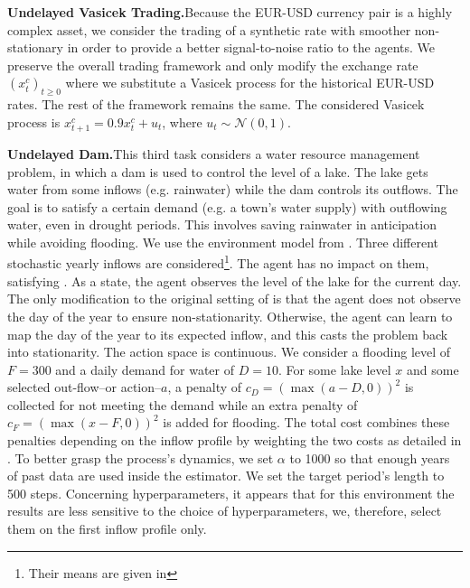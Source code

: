 \noindent\textbf{Undelayed Vasicek Trading.}\indent Because the EUR-USD currency pair is a highly complex asset, we consider the trading of a synthetic rate with smoother non-stationary in order to provide a better signal-to-noise ratio to the agents.
We preserve the overall trading framework and only modify the exchange rate $(x_{t}^{c})_{t\ge0}$ where we substitute a Vasicek process for the historical EUR-USD rates. 
The rest of the framework remains the same. 
The considered Vasicek process is $x_{t+1}^{c} = 0.9 x_{t}^{c} + u_t$, where $u_t\sim\mathcal{N}(0,1)$. 

\noindent\textbf{Undelayed Dam.}\indent This third task considers a water resource management problem, in which a dam is used to control the level of a lake.
The lake gets water from some inflows (e.g. rainwater) while the dam controls its outflows. 
The goal is to satisfy a certain demand (e.g. a town's water supply) with outflowing water, even in drought periods. 
This involves saving rainwater in anticipation while avoiding flooding.
We use the environment model from \cite{castelletti2010tree, pmlr-v80-tirinzoni18a}.
Three different stochastic yearly inflows are considered\footnote{Their means are given in }.
The agent has no impact on them, satisfying .
As a state, the agent observes the level of the lake for the current day.
The only modification to the original setting of \cite{castelletti2010tree, pmlr-v80-tirinzoni18a} is that the agent does not observe the day of the year to ensure non-stationarity.
Otherwise, the agent can learn to map the day of the year to its expected inflow, and this casts the problem back into stationarity.
The action space is continuous. 
We consider a flooding level of $F=300$ and a daily demand for water of $D=10$.
For some lake level $x$ and some selected out-flow--or action--$a$, a penalty of $c_D = (\max(a-D,0))^2$ is collected for not meeting the demand while an extra penalty of $c_F = (\max(x-F,0))^2$ is added for flooding.
The total cost combines these penalties depending on the inflow profile by weighting the two costs as detailed in . 
To better grasp the process's dynamics, we set $\alpha$ to 1000 so that enough years of past data are used inside the estimator. 
We set the target period's length to 500 steps. 
Concerning hyperparameters, it appears that for this environment the results are less sensitive to the choice of hyperparameters, we, therefore, select them on the first inflow profile only.

